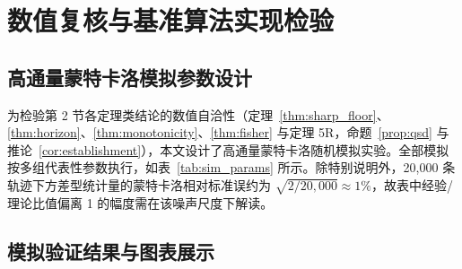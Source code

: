\documentclass[11pt,a4paper]{article}
\theoremstyle{plain}
\theoremstyle{definition}
\begin{document}
\section{数值复核与基准算法实现检验}\label{sec:simulation}

\subsection{高通量蒙特卡洛模拟参数设计}

为检验第 2 节各定理类结论的数值自洽性（定理~\ref{thm:sharp_floor}、\ref{thm:horizon}、\ref{thm:monotonicity}、\ref{thm:fisher} 与定理 5R，命题~\ref{prop:qsd} 与推论~\ref{cor:establishment}），本文设计了高通量蒙特卡洛随机模拟实验。全部模拟按多组代表性参数执行，如表~\ref{tab:sim_params} 所示。除特别说明外，20,000 条轨迹下方差型统计量的蒙特卡洛相对标准误约为 $\sqrt{2/20{,}000} \approx 1\%$，故表中经验/理论比值偏离 1 的幅度需在该噪声尺度下解读。



\subsection{模拟验证结果与图表展示}
\end{document}
